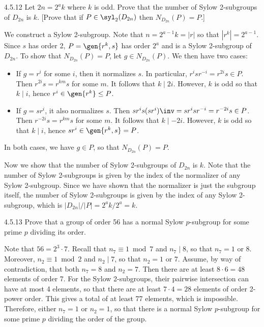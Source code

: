 \begin{exercise}{4.5.12}
	Let $2n = 2^ak$ where $k$ is odd.
	Prove that the number of Sylow 2-subgroups of $D_{2n}$ is $k$. [Prove that if $P \in \syl_2(D_{2n})$ then $N_{D_{2n}}(P) = P$.]
\end{exercise}

\begin{sol}
	We construct a Sylow 2-subgroup.
	Note that $n = 2^{a - 1}k = |r|$ so that $|r^k| = 2^{a - 1}$.
	Since $s$ has order 2, $P = \gen{r^k, s}$ has order $2^a$ and is a Sylow 2-subgroup of $D_{2n}$.
	To show that $N_{D_{2n}}(P) = P$, let $g \in N_{D_{2n}}(P)$.
	We then have two cases:
	\begin{itemize}
		\item If $g = r^i$ for some $i$, then it normalizes $s$.
	In particular, $r^isr^{-i} = r^{2i}s \in P$.
	Then $r^{2i}s = r^{km}s$ for some $m$.
	It follows that $k \mid 2i$.
	However, $k$ is odd so that $k \mid i$, hence $r^i \in \gen{r^k} \leq P$.
		\item If $g = sr^i$, it also normalizes $s$.
	Then $sr^is(sr^i)\inv = sr^isr^{-i} = r^{-2i}s \in P$.
	Then $r^{-2i}s = r^{km}s$ for some $m$.
	It follows that $k \mid -2i$.
	However, $k$ is odd so that $k \mid i$, hence $sr^i \in \gen{r^k, s} = P$.
	\end{itemize}
	In both cases, we have $g \in P$, so that $N_{D_{2n}}(P) = P$.

	Now we show that the number of Sylow 2-subgroups of $D_{2n}$ is $k$.
	Note that the number of Sylow 2-subgroups is given by the index of the normalizer of any Sylow 2-subgroup.
	Since we have shown that the normalizer is just the subgroup itself, the number of Sylow 2-subgroups is given by the index of any Sylow 2-subgroup, which is $|D_{2n}|/|P| = 2^ak/2^a = k$. 
\end{sol}

\begin{exercise}{4.5.13}
	Prove that a group of order 56 has a normal Sylow $p$-subgroup for some prime $p$ dividing its order.
\end{exercise}

\begin{sol}
	Note that $56 = 2^3 \cdot 7$.
	Recall that $n_7 \equiv 1 \bmod 7$ and $n_7 \mid 8$, so that $n_7 = 1$ or $8$.
	Moreover, $n_2 \equiv 1 \bmod 2$ and $n_2 \mid 7$, so that $n_2 = 1$ or $7$.
	Assume, by way of contradiction, that both $n_7 = 8$ and $n_2 = 7$.
	Then there are at least $8 \cdot 6 = 48$ elements of order 7.
	For the Sylow 2-subgroups, their pairwise intersection can have at most 4 elements, so that there are at least $7 \cdot 4 = 28$ elements of order 2-power order.
	This gives a total of at least 77 elements, which is impossible.
	Therefore, either $n_7 = 1$ or $n_2 = 1$, so that there is a normal Sylow $p$-subgroup for some prime $p$ dividing the order of the group.
\end{sol}

